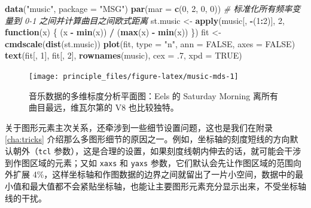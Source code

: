 \documentclass[
  b5paper,
  UTF8,twoside]{book}
\newenvironment{Shaded}{\begin{snugshade}}{\end{snugshade}}
\newcommand{\AttributeTok}[1]{\textcolor[rgb]{0.13,0.29,0.53}{#1}}
\newcommand{\CommentTok}[1]{\textcolor[rgb]{0.56,0.35,0.01}{\textit{#1}}}
\newcommand{\ConstantTok}[1]{\textcolor[rgb]{0.56,0.35,0.01}{#1}}
\newcommand{\ControlFlowTok}[1]{\textcolor[rgb]{0.13,0.29,0.53}{\textbf{#1}}}
\newcommand{\DecValTok}[1]{\textcolor[rgb]{0.00,0.00,0.81}{#1}}
\newcommand{\FunctionTok}[1]{\textcolor[rgb]{0.13,0.29,0.53}{\textbf{#1}}}
\newcommand{\NormalTok}[1]{#1}
\newcommand{\OtherTok}[1]{\textcolor[rgb]{0.56,0.35,0.01}{#1}}
\newcommand{\SpecialCharTok}[1]{\textcolor[rgb]{0.81,0.36,0.00}{\textbf{#1}}}
\newcommand{\StringTok}[1]{\textcolor[rgb]{0.31,0.60,0.02}{#1}}
\begin{document}
\begin{Shaded}
\begin{Highlighting}[]
\FunctionTok{data}\NormalTok{(}\StringTok{"music"}\NormalTok{, }\AttributeTok{package =} \StringTok{"MSG"}\NormalTok{)}
\FunctionTok{par}\NormalTok{(}\AttributeTok{mar =} \FunctionTok{c}\NormalTok{(}\DecValTok{0}\NormalTok{, }\DecValTok{2}\NormalTok{, }\DecValTok{0}\NormalTok{, }\DecValTok{0}\NormalTok{))}
\CommentTok{\# 标准化所有频率变量到 0{-}1 之间并计算曲目之间欧式距离}
\NormalTok{st.music }\OtherTok{\textless{}{-}} \FunctionTok{apply}\NormalTok{(music[, }\SpecialCharTok{{-}}\NormalTok{(}\DecValTok{1}\SpecialCharTok{:}\DecValTok{2}\NormalTok{)], }\DecValTok{2}\NormalTok{, }\ControlFlowTok{function}\NormalTok{(x) \{}
\NormalTok{  (x }\SpecialCharTok{{-}} \FunctionTok{min}\NormalTok{(x)) }\SpecialCharTok{/}\NormalTok{ (}\FunctionTok{max}\NormalTok{(x) }\SpecialCharTok{{-}} \FunctionTok{min}\NormalTok{(x))}
\NormalTok{\})}
\NormalTok{fit }\OtherTok{\textless{}{-}} \FunctionTok{cmdscale}\NormalTok{(}\FunctionTok{dist}\NormalTok{(st.music))}
\FunctionTok{plot}\NormalTok{(fit, }\AttributeTok{type =} \StringTok{"n"}\NormalTok{, }\AttributeTok{ann =} \ConstantTok{FALSE}\NormalTok{, }\AttributeTok{axes =} \ConstantTok{FALSE}\NormalTok{)}
\FunctionTok{text}\NormalTok{(fit[, }\DecValTok{1}\NormalTok{], fit[, }\DecValTok{2}\NormalTok{], }\FunctionTok{rownames}\NormalTok{(music), }\AttributeTok{cex =}\NormalTok{ .}\DecValTok{7}\NormalTok{, }\AttributeTok{xpd =} \ConstantTok{TRUE}\NormalTok{)}
\end{Highlighting}
\end{Shaded}

\begin{figure}

{\centering \texttt{[image: principle\_files/figure-latex/music-mds-1]} 

}

\caption[ 音乐数据的多维标度分析平面图 ]{音乐数据的多维标度分析平面图：Eels 的 Saturday Morning 离所有曲目最远，维瓦尔第的 V8 也比较独特。}\label{fig:music-mds}
\end{figure}



关于图形元素主次关系，还牵涉到一些细节设置问题，这也是我们在附录 \ref{cha:tricks} 介绍那么多图形细节的原因之一。例如，坐标轴的刻度短线的方向默认朝外（\texttt{tcl} 参数），这是合理的设置，如果刻度线朝内伸去的话，就可能会干涉到作图区域的元素；又如 \texttt{xaxs} 和 \texttt{yaxs} 参数，它们默认会先让作图区域的范围向外扩展 4\%，这样坐标轴和作图数据的边界之间就留出了一片小空间，数据中的最小值和最大值都不会紧贴坐标轴，也能让主要图形元素充分显示出来，不受坐标轴线的干扰。
\end{document}

